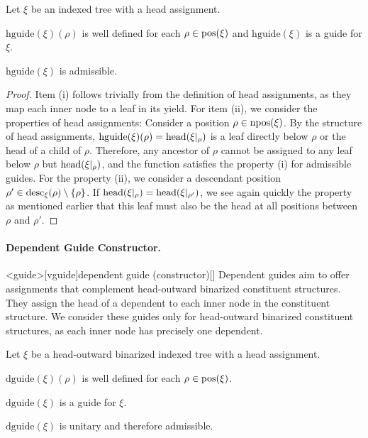 \documentclass[../../document.tex]{subfiles}
\begin{document}
    \begin{theorem}
        Let \(\xi\) be an indexed tree with a head assignment.
        \begin{compactenum}
            \item \(\mathrm{hguide}(\xi)(\rho)\) is well defined for each \(\rho \in \operatorname{pos}(\xi)\) and \(\mathrm{hguide}(\xi)\) is a guide for \(\xi\).
            \item \(\mathrm{hguide}(\xi)\) is admissible.
        \end{compactenum}
    \end{theorem}

    \begin{proof}
        Item (i) follows trivially from the definition of head assignments, as they map each inner node to a leaf in its yield.
        For item (ii), we consider the properties of head assignments:
        Consider a position \(\rho \in \operatorname{npos}(\xi)\).
        By the structure of head assignments, \(\mathrm{hguide}(\xi)(\rho) = \operatorname{head}(\xi|_\rho)\) is a leaf directly below \(\rho\) or the head of a child of \(\rho\).
        Therefore, any ancestor of \(\rho\) cannot be assigned to any leaf below \(\rho\) but \(\operatorname{head}(\xi|_\rho)\), and the function satisfies the property (i) for admissible guides.
        For the property (ii), we consider a descendant position \(\rho' \in \operatorname{desc}_\xi(\rho) \setminus \{\rho\}\).
        If \(\operatorname{head}(\xi|_\rho) = \operatorname{head}(\xi|_{\rho'})\), we see again quickly the property as mentioned earlier that this leaf must also be the head at all positions between \(\rho\) and \(\rho'\).
    \end{proof}

    \paragraph{Dependent Guide Constructor.}\label{sec:extraction:dependency}<guide>[vguide]{dependent guide (constructor)}[]
    Dependent guides aim to offer assignments that complement head-outward binarized constituent structures.
    They assign the head of a dependent to each inner node in the constituent structure.
    We consider these guides only for head-outward binarized constituent structures, as each inner node has precisely one dependent.

    \begin{claim}
        Let \(\xi\) be a head-outward binarized indexed tree with a head assignment.
        \begin{compactenum}
            \item \(\mathrm{dguide}(\xi)(\rho)\) is well defined for each \(\rho \in \operatorname{pos}(\xi)\).
            \item \(\mathrm{dguide}(\xi)\) is a guide for \(\xi\).
            \item \(\mathrm{dguide}(\xi)\) is unitary and therefore admissible.
        \end{compactenum}
    \end{claim}
\end{document}
